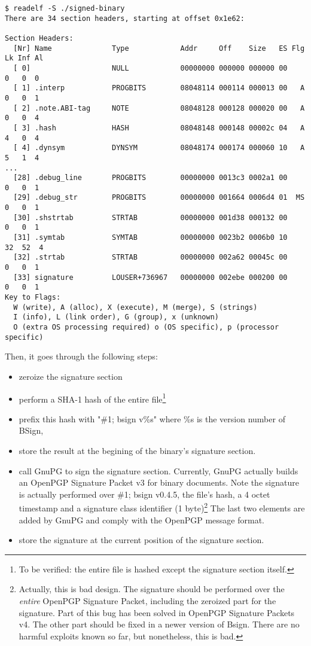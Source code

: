 \documentclass{article}
\begin{document}
\small
\begin{verbatim}
$ readelf -S ./signed-binary
There are 34 section headers, starting at offset 0x1e62:

Section Headers:
  [Nr] Name              Type            Addr     Off    Size   ES Flg Lk Inf Al
  [ 0]                   NULL            00000000 000000 000000 00      0   0  0
  [ 1] .interp           PROGBITS        08048114 000114 000013 00   A  0   0  1
  [ 2] .note.ABI-tag     NOTE            08048128 000128 000020 00   A  0   0  4
  [ 3] .hash             HASH            08048148 000148 00002c 04   A  4   0  4
  [ 4] .dynsym           DYNSYM          08048174 000174 000060 10   A  5   1  4
...
  [28] .debug_line       PROGBITS        00000000 0013c3 0002a1 00      0   0  1
  [29] .debug_str        PROGBITS        00000000 001664 0006d4 01  MS  0   0  1
  [30] .shstrtab         STRTAB          00000000 001d38 000132 00      0   0  1
  [31] .symtab           SYMTAB          00000000 0023b2 0006b0 10     32  52  4
  [32] .strtab           STRTAB          00000000 002a62 00045c 00      0   0  1
  [33] signature         LOUSER+736967   00000000 002ebe 000200 00      0   0  1
Key to Flags:
  W (write), A (alloc), X (execute), M (merge), S (strings)
  I (info), L (link order), G (group), x (unknown)
  O (extra OS processing required) o (OS specific), p (processor specific)
\end{verbatim}
\normalsize

Then, it goes through the following steps:
\begin{itemize}
\item zeroize the signature section

\item perform a SHA-1 hash of the entire file\footnote{To be verified: the entire file is hashed except the signature section itself.}

\item prefix this hash with "\#1; bsign v\%s" where \%s 
is the version number of BSign,

\item store the result at the begining of the binary's signature
section. 

\item call GnuPG to sign the signature section. Currently, GnuPG actually
builds an OpenPGP Signature Packet v3 for binary documents. Note
the signature is actually performed over \#1; bsign v0.4.5,
the file's hash, a 4 octet timestamp and a signature class identifier (1 byte)\footnote{Actually, this is bad design. 
The signature should be performed over the {\it entire} OpenPGP Signature Packet, including the zeroized part for the signature. 
Part of this bug has been solved in OpenPGP Signature Packets v4. The other part should be fixed in a newer version of Bsign.
There are no harmful exploits known so far, but nonetheless, this is bad.}
The last two elements are added by GnuPG and comply with the OpenPGP
message format.

\item store the signature at the current position of the signature
section.

\end{itemize}
\end{document}
